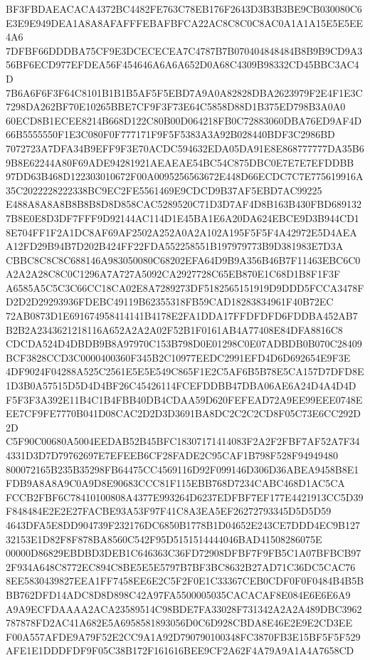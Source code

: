 \documentclass[UTF8,fontset=fandol,zihao=-4,a4paper]{ctexart}
\begin{document}
{{BF3FBDAEACACA4372BC4482FE763C78EB176F2643D3B3B3BE9CB030080C6E3E9E949DEA1A8A8AFAFFFEBAFBFCA22AC8C8C0C8AC0A1A1A15E5E5EE4A6
7DFBF66DDDBA75CF9E3DCECECEA7C4787B7B070404848484B8B9B9CD9A356BF6ECD977EFDEA56F454646A6A6A652D0A68C4309B98332CD45BBC3AC4D
7B6A6F6F3F64C8101B1B1B5AF5F5EBD7A9A0A82828DBA2623979F2E4F1E3C7298DA262BF70E10265BBE7CF9F3F73E64C5858D88D1B375ED798B3A0A0
60ECD8B1ECEE8214B668D122C80B00D064218FB0C72883060DBA76ED9AF4D66B5555550F1E3C080F0F777171F9F5F5383A3A92B028440BDF3C2986BD
7072723A7DFA34B9EFF9F3E70ACDC594632EDA05DA91E8E868777777DA35B69B8E62244A80F69ADE94281921AEAEAE54BC54C875DBC0E7E7E7EFDDBB
97DD63B468D122303010672F00A0095256563672E448D66ECDC7C7E775619916A35C2022228222338BC9EC2FE5561469E9CDCD9B37AF5EBD7AC99225
E488A8A8A8B8B8B8D8D858CAC5289520C71D3D7AF4D8B163B430FBD6891327B8E0E8D3DF7FFF9D92144AC114D1E45BA1E6A20DA624EBCE9D3B944CD1
8E704FF1F2A1DC8AF69AF2502A252A0A2A102A195F5F5F4A42972E5D4AEAA12FD29B94B7D202B424FF22FDA552258551B197979773B9D381983E7D3A
CBBC8C8C8C688146A983050080C68202EFA64D9B9A356B46B7F11463EBC6C0A2A2A28C8C0C1296A7A727A5092CA2927728C65EB870E1C68D1B8F1F3F
A6585A5C5C3C66CC18CA02E8A7289273DF5182565151919D9DDD5FCCA3478FD2D2D29293936FDEBC49119B62355318FB59CAD18283834961F40B72EC
72AB0873D1E691674958414141B4178E2FA1DDA17FFDFDFD6FDDBA452AB7B2B2A2343621218116A652A2A2A02F52B1F0161AB4A77408E84DFA8816C8
CDCDA524D4DBDB9B8A97970C153B798D0E01298C0E07ADBDB0B070C28409BCF3828CCD3C0000400360F345B2C10977EEDC2991EFD4D6D692654E9F3E
4DF9024F04288A525C2561E5E5E549C865F1E2C5AF6B5B78E5CA157D7DFD8E1D3B0A57515D5D4D4BF26C45426114FCEFDDBB47DBA06AE6A24D4A4D4D
F5F3F3A392E11B4C1B4FBB40DB4CDAA59D620FEFEAD72A9EE99EEE0748EEE7CF9FE7770B041D08CAC2D2D3D3691BA8DC2C2C2CD8F05C73E6CC292D2D
C5F90C00680A5004EEDAB52B45BFC18307171414083F2A2F2FBF7AF52A7F344331D3D7D79762697E7EFEEB6CF28FADE2C95CAF1B798F528F94949480
800072165B235B35298FB64475CC4569116D92F099146D306D36ABEA9458B8E1FDB9A8A8A9C0A9D8E90683CCC81F115EBB768D7234CABC468D1AC5CA
FCCB2FBF6C78410100808A4377E993264D6237EDFBF7EF177E4421913CC5D39F848484E2E2E27FACBE93A53F97F41C8A3EA5EF26272793345D5D5D59
4643DFA5E8DD904739F232176DC6850B1778B1D04652E243CE7DDD4EC9B12732153E1D82F8F878BA8560C542F95D5151514444046BAD41508286075E
00000D86829EBDBD3DEB1C646363C36FD72908DFBF7F9FB5C1A07BFBCB972F934A648C8772EC894C8BE5E5E5797B7BF3BC8632B27AD71C36DC5CAC76
8EE5830439827EEA1FF7458EE6E2C5F2F0E1C33367CEB0CDF0F0F0484B4B5BBB762DFD14ADC8D8D898C42A97FA5500005035CACACAF8E084E6E6E6A9
A9A9ECFDAAAA2ACA23589514C98BDE7FA33028F731342A2A2A489DBC3962787878FD2AC41A682E5A6958581893056D0C6D928CBDA8E46E2E9E2CD3EE
F00A557AFDE9A79F52E2CC9A1A92D790790100348FC3870FB3E15BF5F5F529AFE1E1DDDFDF9F05C38B172F161616BEE9CF2A62F4A79A9A1A4A7658CD
}}
\end{document}
